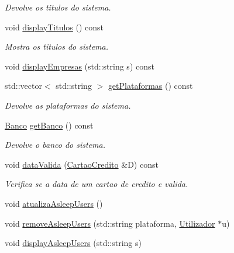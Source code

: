 \begin{DoxyCompactItemize}
\begin{DoxyCompactList}\small\item\em Devolve os titulos do sistema. \end{DoxyCompactList}\item 
void \mbox{\hyperlink{class_sistema_abf82916720d1255bba6437abf0094ca6}{display\+Titulos}} () const
\begin{DoxyCompactList}\small\item\em Mostra os titulos do sistema. \end{DoxyCompactList}\item 
void \mbox{\hyperlink{class_sistema_a4380aacc310d051a753138477d8e777f}{display\+Empresas}} (std\+::string s) const
\item 
std\+::vector$<$ std\+::string $>$ \mbox{\hyperlink{class_sistema_ac7b28e4e7856327b1553133c39a843d6}{get\+Plataformas}} () const
\begin{DoxyCompactList}\small\item\em Devolve as plataformas do sistema. \end{DoxyCompactList}\item 
\mbox{\hyperlink{class_banco}{Banco}} \mbox{\hyperlink{class_sistema_abb768fdc8d4b8290ab4a267fc7a84a39}{get\+Banco}} () const
\begin{DoxyCompactList}\small\item\em Devolve o banco do sistema. \end{DoxyCompactList}\item 
void \mbox{\hyperlink{class_sistema_a0d6da6cf391b19d37001dab66c861b93}{data\+Valida}} (\mbox{\hyperlink{class_cartao_credito}{Cartao\+Credito}} \&D) const
\begin{DoxyCompactList}\small\item\em Verifica se a data de um cartao de credito e valida. \end{DoxyCompactList}\item 
void \mbox{\hyperlink{class_sistema_a265736b1b095448d7343b199a1ade7e5}{atualiza\+Asleep\+Users}} ()
\item 
void \mbox{\hyperlink{class_sistema_a59ff239e4793308c979cccf796a72f23}{remove\+Asleep\+Users}} (std\+::string plataforma, \mbox{\hyperlink{class_utilizador}{Utilizador}} $\ast$u)
\item 
void \mbox{\hyperlink{class_sistema_a6f73ddef363e2bc3e1c36dcb0d6d6152}{display\+Asleep\+Users}} (std\+::string s)
\end{DoxyCompactItemize}
